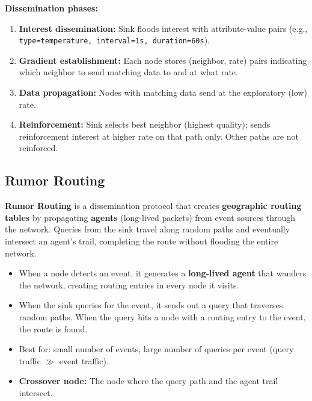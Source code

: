 \documentclass[12pt,a4paper]{article}
\begin{document}
\textbf{Dissemination phases:}
\begin{enumerate}[leftmargin=*, itemsep=3pt]
  \item \textbf{Interest dissemination:} Sink floods interest with attribute-value pairs (e.g., \texttt{type=temperature, interval=1s, duration=60s}).
  \item \textbf{Gradient establishment:} Each node stores (neighbor, rate) pairs indicating which neighbor to send matching data to and at what rate.
  \item \textbf{Data propagation:} Nodes with matching data send at the exploratory (low) rate.
  \item \textbf{Reinforcement:} Sink selects best neighbor (highest quality); sends reinforcement interest at higher rate on that path only. Other paths are not reinforced.
\end{enumerate}

\subsection{Rumor Routing}

\begin{tcolorbox}[defbox, title={\textbf{Rumor Routing --- Definition}}]
\textbf{Rumor Routing} is a dissemination protocol that creates \textbf{geographic routing tables} by propagating \textbf{agents} (long-lived packets) from event sources through the network. Queries from the sink travel along random paths and eventually intersect an agent's trail, completing the route without flooding the entire network.
\end{tcolorbox}

\begin{itemize}[leftmargin=*, itemsep=3pt]
  \item When a node detects an event, it generates a \textbf{long-lived agent} that wanders the network, creating routing entries in every node it visits.
  \item When the sink queries for the event, it sends out a query that traverses random paths. When the query hits a node with a routing entry to the event, the route is found.
  \item Best for: small number of events, large number of queries per event (query traffic $\gg$ event traffic).
  \item \textbf{Crossover node:} The node where the query path and the agent trail intersect.
\end{itemize}

\end{document}
